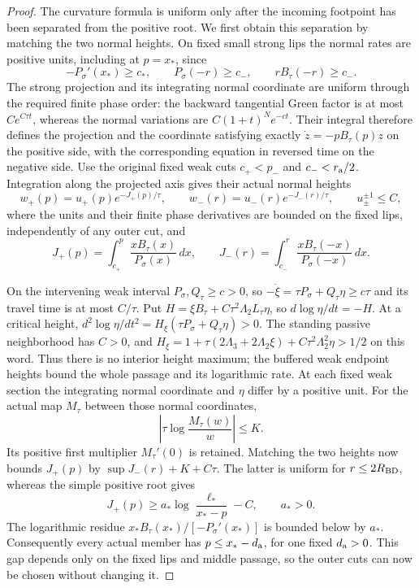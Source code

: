 \begin{proof}
The curvature formula is uniform only after the incoming footpoint has
been separated from the positive root. We first obtain this separation
by matching the two normal heights. On fixed
small strong lips the normal rates are positive units, including at
\(p=x_*\), since
\[
 -P_\sigma'(x_*)\ge c_*,\qquad
 P_\sigma(-r)\ge c_-,\qquad rB_\tau(-r)\ge c_- .
\]
The strong projection and its integrating normal coordinate are uniform
through the required finite phase order: the backward tangential Green
factor is at most \(Ce^{C\tau t}\), whereas the normal variations are
\(C(1+t)^Ne^{-ct}\). Their integral therefore defines the projection
and the coordinate satisfying exactly \(\dot z=-pB_\tau(p)z\) on
the positive side, with the corresponding equation in reversed time on the negative side.
Use the original fixed weak cuts \(c_+<p_-\) and \(c_-<r_{\rm a}/2\).
Integration along the projected axis gives their actual normal heights
\[
 w_+(p)=u_+(p)e^{-J_+(p)/\tau},\qquad
 w_-(r)=u_-(r)e^{-J_-(r)/\tau},\qquad u_\pm^{\pm1}\le C,
\]
where the units and their finite phase derivatives are bounded on the
fixed lips, independently of any outer cut, and
\[
 J_+(p)=\int_{c_+}^p\frac{xB_\tau(x)}{P_\sigma(x)}\,dx,
 \qquad J_-(r)=\int_{c_-}^r\frac{xB_\tau(-x)}{P_\sigma(-x)}\,dx .
\]

On the intervening weak interval \(P_\sigma,Q_\tau\ge c>0\), so
\(-\dot\xi=\tau P_\sigma+Q_\tau\eta\ge c\tau\) and its travel
time is at most \(C/\tau\). Put
\(H=\xi B_\tau+C\tau^2\Lambda_2L_\tau\eta\), so
\(d\log\eta/dt=-H\). At a critical height,
\(d^2\log\eta/dt^2=H_\xi(\tau P_\sigma+Q_\tau\eta)>0\).
The standing passive neighborhood has \(C>0\), and
\(H_\xi=1+\tau(2\Lambda_3+2\Lambda_2\xi)
+C\tau^2\Lambda_2^2\eta>1/2\) on this word. Thus there is no
interior height maximum; the buffered weak endpoint heights bound the
whole passage and its logarithmic rate. At each fixed weak section
the integrating normal coordinate and \(\eta\) differ by a positive
unit. For the actual map \(M_\tau\) between those normal coordinates,
\[
 \left|\tau\log\frac{M_\tau(w)}w\right|\le K .
\]
Its positive first multiplier \(M_\tau'(0)\) is retained. Matching
the two heights now bounds \(J_+(p)\) by \(\sup J_-(r)+K+C\tau\).
The latter is uniform for \(r\le2R_{\rm BD}\), whereas the simple
positive root gives
\[
 J_+(p)\ge a_*\log\frac{\ell_*}{x_*-p}-C,
 \qquad a_*>0 .
\]
The logarithmic residue \(x_*B_\tau(x_*)/[-P_\sigma'(x_*)]\)
is bounded below by \(a_*\).
Consequently every actual member has \(p\le x_*-d_{\rm a}\), for
one fixed \(d_{\rm a}>0\). This gap depends only on the fixed lips and middle passage, so the
outer cuts can now be chosen without changing it.


\end{proof}
